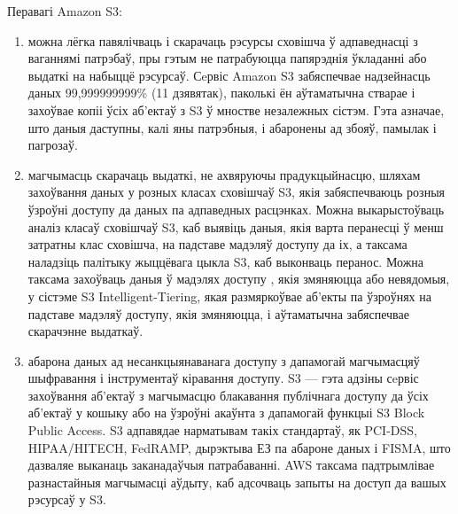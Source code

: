 Перавагі Amazon S3:
\begin{enumerate}
    \item можна лёгка павялічваць і скарачаць рэсурсы сховішча ў адпаведнасці з ваганнямі патрэбаў, пры гэтым не патрабуюцца папярэднія ўкладанні або выдаткі на набыццё рэсурсаў. Сeрвіс Amazon S3 забяспечвае надзейнасць даных 99,999999999\% (11 дзявятак), паколькі ён аўтаматычна стварае і захоўвае копіі ўсіх аб'ектаў з S3 ў мностве незалежных сістэм. Гэта азначае, што даныя даступны, калі яны патрэбныя, і абаронены ад збояў, памылак і пагрозаў.
    \item магчымасць скарачаць выдаткі, не ахвяруючы прадукцыйнасцю, шляхам захоўвання даных у розных класах сховішчаў S3, якія забяспечваюць розныя ўзроўні доступу да даных па адпаведных расцэнках. Можна выкарыстоўваць аналіз класаў сховішчаў S3, каб выявіць даныя, якія варта перанесці ў менш затратны клас сховішча, на падставе мадэляў доступу да іх, а таксама наладзіць палітыку жыццёвага цыкла S3, каб выконваць перанос. Можна таксама захоўваць даныя ў мадэлях доступу , якія змяняюцца або невядомыя, у сістэме S3 Intelligent-Tiering, якая размяркоўвае аб'екты па ўзроўнях на падставе мадэляў доступу, якія змяняюцца, і аўтаматычна забяспечвае скарачэнне выдаткаў.
    \item абарона даных ад несанкцыянаванага доступу з дапамогай магчымасцяў шыфравання і інструментаў кіравання доступу. S3 --- гэта адзіны сeрвіс захоўвання аб'ектаў з магчымасцю блакавання публічнага доступу да ўсіх аб'ектаў у кошыку або на ўзроўні акаўнта з дапамогай функцыі S3 Block Public Access. S3 адпавядае нарматывам такіх стандартаў, як PCI-DSS, HIPAA/HITECH, FedRAMP, дырэктыва ЕЗ па абароне даных і FISMA, што дазваляе выканаць заканадаўчыя патрабаванні. AWS таксама падтрымлівае разнастайныя магчымасці аўдыту, каб адсочваць запыты на доступ да вашых рэсурсаў у S3.
\end{enumerate}
